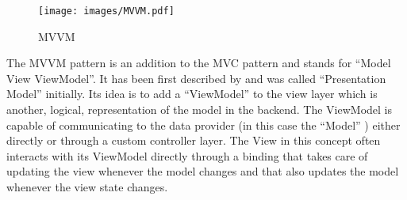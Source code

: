 \begin{figure}[htb]
  \centerline{\texttt{[image: images/MVVM.pdf]}}
  \caption[MVVM]{MVVM}
  \label{fig:mvvm}
\end{figure}

The MVVM pattern is an addition to the MVC pattern and stands for ``Model View ViewModel''. It has been first described by \cite{fowler04mvvm} and was called ``Presentation Model'' initially. Its idea is to add a ``ViewModel'' to the view layer which is another, logical, representation of the model in the backend. The ViewModel is capable of communicating to the data provider (in this case the ``Model'' ) either directly or through a custom controller layer. The View in this concept often interacts with its ViewModel directly through a binding that takes care of updating the view whenever the model changes and that also updates the model whenever the view state changes.